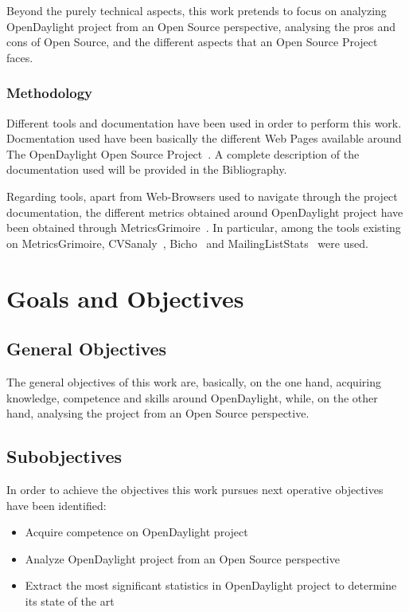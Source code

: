 \documentclass[a4paper, 12pt]{book}
\begin{document}
Beyond the purely technical aspects, this work pretends to focus on analyzing OpenDaylight project from an Open Source perspective, analysing the pros and cons of Open Source, and the different aspects that an Open Source Project faces.

\subsection{Methodology}
\label{subsec:methodology}
Different tools and documentation have been used in order to perform this work. Docmentation used have been basically the different Web Pages available around The OpenDaylight Open Source Project~\cite{OpenDaylight}. A complete description of the documentation used will be provided in the Bibliography.

Regarding tools, apart from Web-Browsers used to navigate through the project documentation, the different metrics obtained around OpenDaylight project have been obtained through MetricsGrimoire~\cite{MetricsGrimoire}. In particular, among the tools existing on MetricsGrimoire, CVSanaly~\cite{CVSanaly}, Bicho~\cite{Bicho} and MailingListStats~\cite{MailStats} were used.

\chapter{Goals and Objectives}
\label{chap:Goals}
\section{General Objectives}
\label{sec:genobj}

The general objectives of this work are, basically, on the one hand, acquiring knowledge, competence and skills around OpenDaylight, while, on the other hand, analysing the project from an Open Source perspective.

\section{Subobjectives}
\label{sec:subobj}

In order to achieve the objectives this work pursues next operative objectives have been identified:

\begin{itemize}
\item{Acquire competence on OpenDaylight project}
\item{Analyze OpenDaylight project from an Open Source perspective}
\item{Extract the most significant statistics in OpenDaylight project to determine its state of the art}
\end{itemize}
\end{document}
